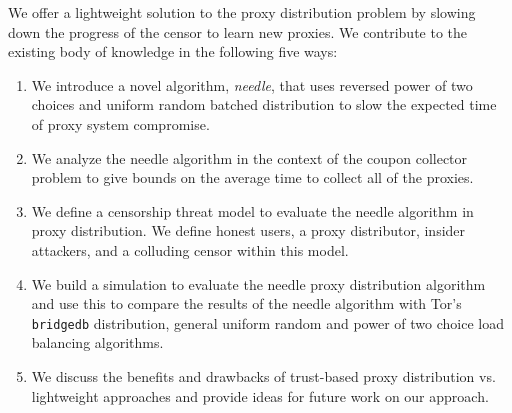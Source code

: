 We offer a lightweight solution to the proxy distribution problem by slowing down the progress of the censor to learn new proxies. We contribute to the existing body of knowledge in the following five ways:
\begin{enumerate}
    \item We introduce a novel algorithm, \emph{needle}, that uses reversed power of two choices and uniform random batched distribution to slow the expected time of proxy system compromise.
    \item We analyze the needle algorithm in the context of the coupon collector problem to give bounds on the average time to collect all of the proxies.
    \item We define a censorship threat model to evaluate the needle algorithm in proxy distribution. We define honest users, a proxy distributor, insider attackers, and a colluding censor within this model.
    \item We build a simulation to evaluate the needle proxy distribution algorithm and use this to compare the results of the needle algorithm with Tor's \texttt{bridgedb} distribution, general uniform random and power of two choice load balancing algorithms. 
    \item We discuss the benefits and drawbacks of trust-based proxy distribution vs. lightweight approaches and provide ideas for future work on our approach.
\end{enumerate}